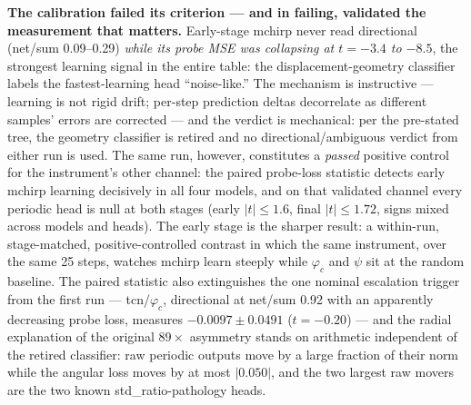 \documentclass[11pt]{article}
\begin{document}
\textbf{The calibration failed its criterion --- and in failing, validated the measurement that matters.}
Early-stage mchirp never read directional (net/sum 0.09--0.29) \emph{while its probe MSE was collapsing at $t = -3.4$ to $-8.5$}, the strongest learning signal in the entire table: the displacement-geometry classifier labels the fastest-learning head ``noise-like.''
The mechanism is instructive --- learning is not rigid drift; per-step prediction deltas decorrelate as different samples' errors are corrected --- and the verdict is mechanical: per the pre-stated tree, the geometry classifier is retired and no directional/ambiguous verdict from either run is used.
The same run, however, constitutes a \emph{passed} positive control for the instrument's other channel: the paired probe-loss statistic detects early mchirp learning decisively in all four models, and on that validated channel every periodic head is null at both stages (early $|t| \le 1.6$, final $|t| \le 1.72$, signs mixed across models and heads).
The early stage is the sharper result: a within-run, stage-matched, positive-controlled contrast in which the same instrument, over the same 25 steps, watches mchirp learn steeply while $\varphi_c$ and $\psi$ sit at the random baseline.
The paired statistic also extinguishes the one nominal escalation trigger from the first run --- tcn/$\varphi_c$, directional at net/sum 0.92 with an apparently decreasing probe loss, measures $-0.0097 \pm 0.0491$ ($t = -0.20$) --- and the radial explanation of the original $89\times$ asymmetry stands on arithmetic independent of the retired classifier: raw periodic outputs move by a large fraction of their norm while the angular loss moves by at most $|0.050|$, and the two largest raw movers are the two known std\_ratio-pathology heads.
\end{document}
